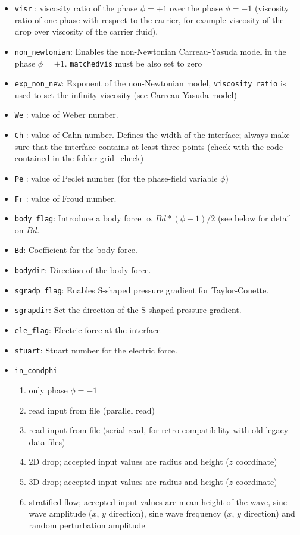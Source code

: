 \begin{itemize}[label={$\circ$}]
\item \texttt{visr} : viscosity ratio of the phase $\phi=+1$ over the phase $\phi=-1$ (viscosity ratio of one phase with respect to the carrier, for example viscosity of the drop over viscosity of the carrier fluid).
\item \texttt{non\_newtonian}: Enables the non-Newtonian Carreau-Yasuda model in the phase $\phi=+1$. \texttt{matchedvis} must be also set to zero
\item \texttt{exp\_non\_new}: Exponent of the non-Newtonian model, \texttt{viscosity ratio} is used to set the infinity viscosity (see Carreau-Yasuda model)
\item \texttt{We} : value of Weber number.
\item \texttt{Ch} : value of Cahn number. Defines the width of the interface; always make sure that the interface contains at least three points (check with the code contained in the folder grid\_check)
\item \texttt{Pe} : value of Peclet number (for the phase-field variable $\phi$)
\item \texttt{Fr} : value of Froud number.
\item \texttt{body\_flag}: Introduce a body force $\propto Bd*(\phi+1)/2$ (see below for detail on $Bd$.
\item \texttt{Bd}: Coefficient for the body force.
\item \texttt{bodydir}: Direction of the body force.
\item \texttt{sgradp\_flag}: Enables S-shaped pressure gradient for Taylor-Couette.
\item \texttt{sgrapdir}: Set the direction of the S-shaped pressure gradient.
\item \texttt{ele\_flag}: Electric force at the interface
\item \texttt{stuart}: Stuart number for the electric force.
\item \texttt{in\_condphi}
\begin{enumerate}
\item only phase $\phi=-1$
\item read input from file (parallel read)
\item read input from file (serial read, for retro-compatibility with old legacy data files)
\item 2D drop; accepted input values are radius and height ($z$ coordinate)
\item 3D drop; accepted input values are radius and height ($z$ coordinate)
\item stratified flow; accepted input values are mean height of the wave, sine wave amplitude ($x$, $y$ direction), sine wave frequency ($x$, $y$ direction) and random perturbation amplitude

\end{enumerate}
\end{itemize}
